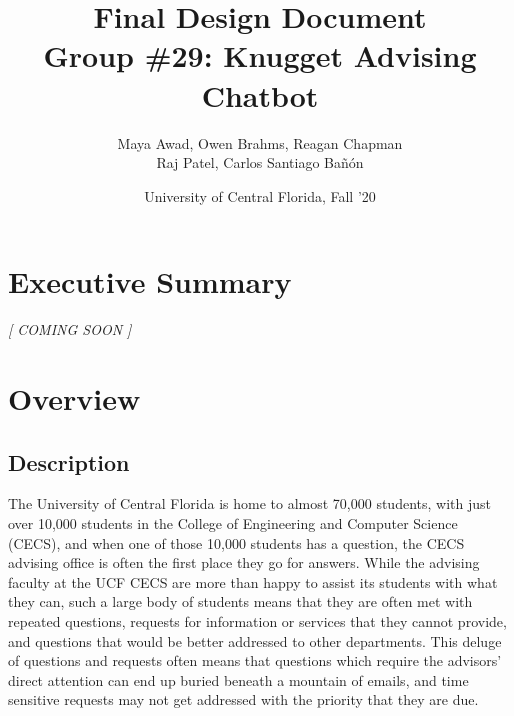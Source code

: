 \documentclass[titlepage, 12pt]{article}
\title{\textbf{Final Design Document} \\
    \large Group \#29: Knugget Advising Chatbot}
\author{Maya Awad, Owen Brahms, Reagan Chapman \\
    Raj Patel, Carlos Santiago Bañón}
\date{University of Central Florida, Fall '20}
\begin{document}
\maketitle


\tableofcontents
\pagebreak




\section{Executive Summary}

\begin{center}\emph{[ COMING SOON ]}\end{center}

\pagebreak



\section{Overview}

\subsection{Description}

The University of Central Florida is home to almost 70,000 students, with just over 10,000 students in the College of Engineering and Computer Science (CECS), and when one of those 10,000 students has a question, the CECS advising office is often the first place they go for answers. While the advising faculty at the UCF CECS are more than happy to assist its students with what they can, such a large body of students means that they are often met with repeated questions, requests for information or services that they cannot provide, and questions that would be better addressed to other departments. This deluge of questions and requests often means that questions which require the advisors’ direct attention can end up buried beneath a mountain of emails, and time sensitive requests may not get addressed with the priority that they are due.
\end{document}
